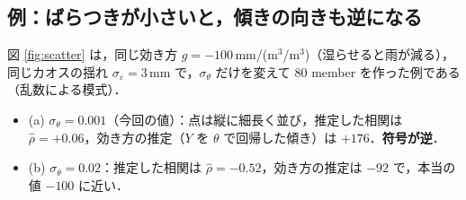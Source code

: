 \documentclass[dvipdfmx,a4paper,10.5pt]{jarticle}
\numberwithin{equation}{section}
\begin{document}
\subsection{例：ばらつきが小さいと，傾きの向きも逆になる}
図 \ref{fig:scatter} は，同じ効き方 $g=-100$\,mm/(m$^3$/m$^3$)（湿らせると雨が減る），
同じカオスの揺れ $\sigma_\varepsilon=3$\,mm で，$\sigma_\theta$ だけを変えて 80 member を作った例である（乱数による模式）．
\begin{itemize}
  \item (a) $\sigma_\theta=0.001$（今回の値）：点は縦に細長く並び，推定した相関は $\hat\rho=+0.06$，効き方の推定（$Y$ を $\theta$ で回帰した傾き）は $+176$．\textbf{符号が逆}．
  \item (b) $\sigma_\theta=0.02$：推定した相関は $\hat\rho=-0.52$，効き方の推定は $-92$ で，本当の値 $-100$ に近い．
\end{itemize}
\end{document}
